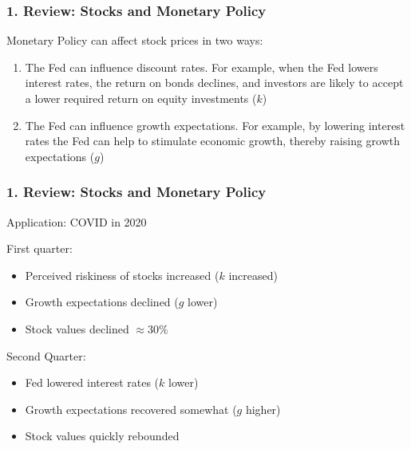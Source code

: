 \documentclass{beamer}
\begin{document}
\begin{frame}[t]
    \frametitle{1. Review: Stocks and Monetary Policy}

    Monetary Policy can affect stock prices in two ways:
    \begin{enumerate}
        \item The Fed can influence discount rates.   For example, when the Fed lowers interest rates, the return on bonds declines, and investors are likely to accept a lower required return on equity investments ($k$)
        \item The Fed can influence growth expectations.  For example, by lowering interest rates the Fed can help to stimulate economic growth, thereby raising growth expectations ($g$)
    \end{enumerate}

\end{frame}

\begin{frame}[t]
    \frametitle{1. Review: Stocks and Monetary Policy}

    Application: COVID in 2020
    \vspace{1em}

    First quarter:
    \begin{itemize}
        \item Perceived riskiness of stocks increased ($k$ increased)
        \item Growth expectations declined ($g$ lower)
        \item Stock values declined $\approx30\%$
    \end{itemize}
    \vspace{1em}
  
    Second Quarter:
    \begin{itemize}
        \item Fed lowered interest rates ($k$ lower)
        \item Growth expectations recovered somewhat ($g$ higher)
        \item Stock values quickly rebounded
    \end{itemize}

\end{frame}
\end{document}
